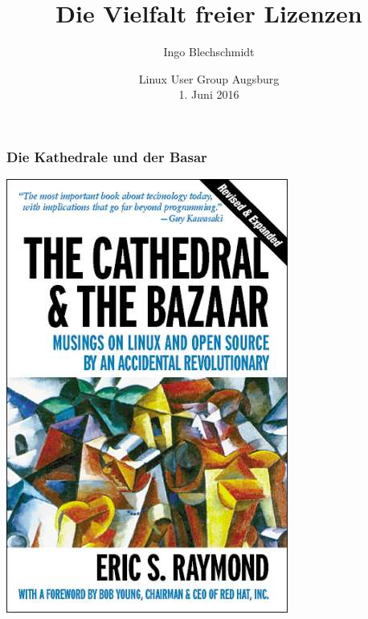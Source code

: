 \documentclass[12pt,compress,ngerman,utf8,t]{beamer}
\title{Die Vielfalt freier Lizenzen}
\author[Linux User Group Augsburg e.V.]{Ingo Blechschmidt}
\date{Linux User Group Augsburg \\ 1. Juni 2016}
\begin{document}
\frame{\titlepage}

\begin{frame}\frametitle{Die Kathedrale und der Basar}
  \centering
  \includegraphics[height=0.85\textheight]{images/cathedral-bazaar}
  \par
\end{frame}
\end{document}
